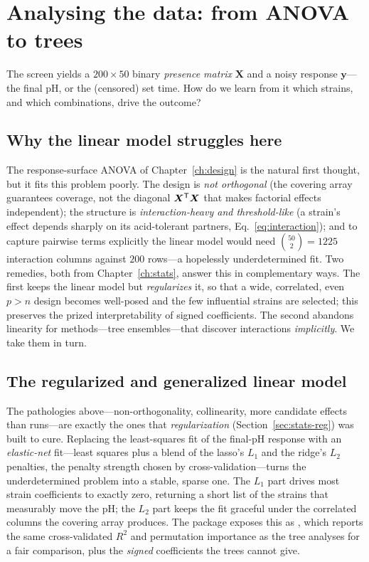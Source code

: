 \section{Analysing the data: from ANOVA to trees}
\label{sec:ferm-analysis}

The screen yields a $200\times 50$ binary \emph{presence matrix} $\bm X$ and a
noisy response $\bm y$---the final pH, or the (censored) set time. How do we learn
from it which strains, and which combinations, drive the outcome?

\subsection{Why the linear model struggles here}

The response-surface ANOVA of Chapter~\ref{ch:design} is the natural first thought,
but it fits this problem poorly. The design is \emph{not orthogonal} (the covering
array guarantees coverage, not the diagonal $\bm X^{\mathsf{T}}\bm X$ that makes
factorial effects independent); the structure is \emph{interaction-heavy and
threshold-like} (a strain's effect depends sharply on its acid-tolerant partners,
Eq.~\eqref{eq:interaction}); and to capture pairwise terms explicitly the linear
model would need $\binom{50}{2}=1225$ interaction columns against $200$ rows---a
hopelessly underdetermined fit. Two remedies, both from
Chapter~\ref{ch:stats}, answer this in complementary ways. The first keeps the
linear model but \emph{regularizes} it, so that a wide, correlated, even $p>n$
design becomes well-posed and the few influential strains are selected; this
preserves the prized interpretability of signed coefficients. The second
abandons linearity for methods---tree ensembles---that discover interactions
\emph{implicitly}. We take them in turn.

\subsection{The regularized and generalized linear model}
\label{sec:ferm-glm}

The pathologies above---non-orthogonality, collinearity, more candidate effects
than runs---are exactly the ones that \emph{regularization}
(Section~\ref{sec:stats-reg}) was built to cure. Replacing the least-squares fit
of the final-pH response with an \emph{elastic-net} fit---least squares plus a
blend of the lasso's $L_1$ and the ridge's $L_2$ penalties, the penalty strength
chosen by cross-validation---turns the underdetermined problem into a stable,
sparse one. The $L_1$ part drives most strain coefficients to exactly zero,
returning a short list of the strains that measurably move the pH; the $L_2$ part
keeps the fit graceful under the correlated columns the covering array produces.
The package exposes this as , which reports the same
cross-validated $R^2$ and permutation importance as the tree analyses for a fair
comparison, plus the \emph{signed} coefficients the trees cannot give.


